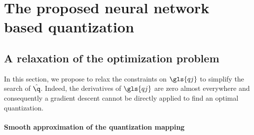 


\section{The proposed neural network based quantization}
\label{sec:proposal}

\subsection{A relaxation of the optimization problem} \label{subsec:relaxation}

In this section, we propose to relax the constraints on $\gls{qj}$ to simplify the search of $\hat{\q}$. Indeed, the derivatives of $\gls{qj}$ are zero almost everywhere and consequently a gradient descent cannot be directly applied to find an optimal quantization.

\paragraph{Smooth approximation of the quantization mapping}

